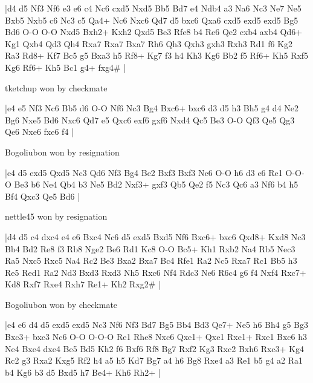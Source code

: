 \makegametitle
|d4 d5 Nf3 Nf6 e3 e6 c4 Nc6 cxd5 Nxd5 Bb5 Bd7 e4 Ndb4 a3 Na6 Nc3 Ne7 Ne5 Bxb5 Nxb5 c6 Nc3 c5 Qa4+ Nc6 Nxc6 Qd7 d5 bxc6 Qxa6 cxd5 exd5 exd5 Bg5 Bd6 O-O O-O Nxd5 Bxh2+ Kxh2 Qxd5 Be3 Rfe8 b4 Re6 Qe2 cxb4 axb4 Qd6+ Kg1 Qxb4 Qd3 Qh4 Rxa7 Rxa7 Bxa7 Rh6 Qh3 Qxh3 gxh3 Rxh3 Rd1 f6 Kg2 Ra3 Rd8+ Kf7 Bc5 g5 Bxa3 h5 Rf8+ Kg7 f3 h4 Kh3 Kg6 Bb2 f5 Rf6+ Kh5 Rxf5 Kg6 Rf6+ Kh5 Bc1 g4+ fxg4\#  |

\showboard

tketchup won by checkmate

\makegametitle
|e4 e5 Nf3 Nc6 Bb5 d6 O-O Nf6 Nc3 Bg4 Bxc6+ bxc6 d3 d5 h3 Bh5 g4 d4 Ne2 Bg6 Nxe5 Bd6 Nxc6 Qd7 e5 Qxc6 exf6 gxf6 Nxd4 Qc5 Be3 O-O Qf3 Qe5 Qg3 Qe6 Nxe6 fxe6 f4  |

\showboard

Bogoliubon won by resignation

\makegametitle
|e4 d5 exd5 Qxd5 Nc3 Qd6 Nf3 Bg4 Be2 Bxf3 Bxf3 Nc6 O-O h6 d3 e6 Re1 O-O-O Be3 b6 Ne4 Qb4 b3 Ne5 Bd2 Nxf3+ gxf3 Qb5 Qe2 f5 Nc3 Qc6 a3 Nf6 b4 h5 Bf4 Qxc3 Qe5 Bd6  |

\showboard

nettle45 won by resignation

\makegametitle
|d4 d5 c4 dxc4 e4 e6 Bxc4 Nc6 d5 exd5 Bxd5 Nf6 Bxc6+ bxc6 Qxd8+ Kxd8 Nc3 Bb4 Bd2 Re8 f3 Rb8 Nge2 Be6 Rd1 Kc8 O-O Bc5+ Kh1 Rxb2 Na4 Rb5 Nec3 Ra5 Nxc5 Rxc5 Na4 Rc2 Be3 Bxa2 Bxa7 Bc4 Rfe1 Ra2 Nc5 Rxa7 Rc1 Bb5 h3 Re5 Red1 Ra2 Nd3 Bxd3 Rxd3 Nh5 Rxc6 Nf4 Rdc3 Ne6 R6c4 g6 f4 Nxf4 Rxc7+ Kd8 Rxf7 Rxe4 Rxh7 Re1+ Kh2 Rxg2\#  |

\showboard

Bogoliubon won by checkmate

\makegametitle
|e4 e6 d4 d5 exd5 exd5 Nc3 Nf6 Nf3 Bd7 Bg5 Bb4 Bd3 Qe7+ Ne5 h6 Bh4 g5 Bg3 Bxc3+ bxc3 Nc6 O-O O-O-O Re1 Rhe8 Nxc6 Qxe1+ Qxe1 Rxe1+ Rxe1 Bxc6 h3 Ne4 Bxe4 dxe4 Be5 Bd5 Kh2 f6 Bxf6 Rf8 Bg7 Rxf2 Kg3 Rxc2 Bxh6 Rxc3+ Kg4 Rc2 g3 Rxa2 Kxg5 Rf2 h4 a5 h5 Kd7 Bg7 a4 h6 Bg8 Rxe4 a3 Re1 b5 g4 a2 Ra1 b4 Kg6 b3 d5 Bxd5 h7 Be4+ Kh6 Rh2+  |

\showboard

